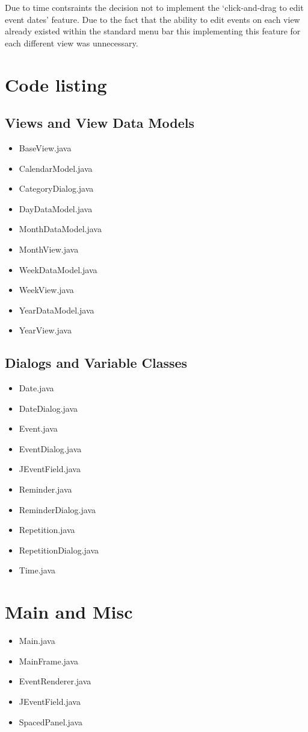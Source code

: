 \documentclass{article}
\begin{document}
Due to time contsraints the decision not to implement the
`click-and-drag to edit event dates' feature. Due to the fact that the
ability to edit events on each view already existed within the standard
menu bar this implementing this feature for each different view was
unnecessary.


\appendix

\section{Code listing}

\subsection{Views and View Data Models}
\begin{itemize}
\item{BaseView.java}
\item{CalendarModel.java}
\item{CategoryDialog.java}
\item{DayDataModel.java}
\item{MonthDataModel.java}
\item{MonthView.java}
\item{WeekDataModel.java}
\item{WeekView.java}
\item{YearDataModel.java}
\item{YearView.java}
\end{itemize}

\subsection{Dialogs and Variable Classes}
\begin{itemize}
\item{Date.java}
\item{DateDialog.java}
\item{Event.java}
\item{EventDialog.java}
\item{JEventField.java}
\item{Reminder.java}
\item{ReminderDialog.java}
\item{Repetition.java}
\item{RepetitionDialog.java}
\item{Time.java}
\end{itemize}

\section{Main and Misc}
\begin{itemize}
\item{Main.java}
\item{MainFrame.java}
\item{EventRenderer.java}
\item{JEventField.java}
\item{SpacedPanel.java}
\end{itemize}
\end{document}
